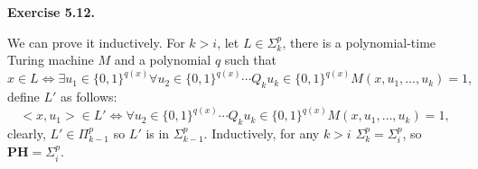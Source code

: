 \documentclass[a4paper]{article}
\newenvironment{exercise}[1]{
	\par
	\noindent\textbf{Exercise #1.}\quad
}{
	\par
	\bigskip
}
\begin{document}
\begin{exercise}{5.12}
We can prove it inductively. For $k>i$, let $L\in\Sigma_k^p$, there is a polynomial-time Turing machine $M$ and a polynomial $q$ such that
$$
x\in L\Leftrightarrow\exists u_1\in\{0,1\}^{q(x)}\forall u_2\in\{0,1\}^{q(x)}\cdots Q_k u_k\in\{0,1\}^{q(x)}M(x,u_1,\dots,u_k)=1,
$$
define $L'$ as follows:
$$
<x,u_1>\in L'\Leftrightarrow\forall u_2\in\{0,1\}^{q(x)}\cdots Q_k u_k\in\{0,1\}^{q(x)}M(x,u_1,\dots,u_k)=1,
$$
clearly, $L'\in\Pi_{k-1}^p$ so $L'$ is in $\Sigma_{k-1}^p$. Inductively, for any $k>i$ $\Sigma_k^p=\Sigma_i^p$, so $\textbf{PH}=\Sigma_i^p$.
\end{exercise}
\end{document}
